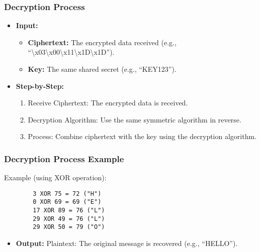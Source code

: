 \documentclass{beamer}
\begin{document}
\begin{frame}
    \frametitle{Decryption Process}
    \begin{itemize}
        \item \textbf{Input:}
        \begin{itemize}
            \item \textbf{Ciphertext:} The encrypted data received (e.g., “\textbackslash x03\textbackslash x00\textbackslash x11\textbackslash x1D\textbackslash x1D”).
            \item \textbf{Key:} The same shared secret (e.g., “KEY123”).
        \end{itemize}
        
        \item \textbf{Step-by-Step:}
        \begin{enumerate}
            \item Receive Ciphertext: The encrypted data is received.
            \item Decryption Algorithm: Use the same symmetric algorithm in reverse.
            \item Process: Combine ciphertext with the key using the decryption algorithm.
        \end{enumerate}
    \end{itemize}
\end{frame}

\begin{frame}[fragile]
    \frametitle{Decryption Process Example}
    \begin{block}{Example (using XOR operation):}
        \begin{lstlisting}
        3 XOR 75 = 72 ("H")
        0 XOR 69 = 69 ("E")
        17 XOR 89 = 76 ("L")
        29 XOR 49 = 76 ("L")
        29 XOR 50 = 79 ("O")
        \end{lstlisting}
        \begin{itemize}
            \item \textbf{Output:} Plaintext: The original message is recovered (e.g., “HELLO”).
        \end{itemize}
    \end{block}
\end{frame}
\end{document}
